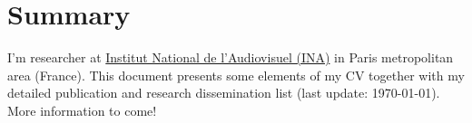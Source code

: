 \documentclass[a4paper,12pt]{article}
\begin{document}


\section*{Summary}

I'm researcher at \href{https://www.ina.fr}{Institut National de l'Audiovisuel (INA)} in Paris metropolitan area (France).
This document presents some elements of my CV together with my detailed publication and research dissemination list (last update: \today).
More information to come!


\tableofcontents



\end{document}
